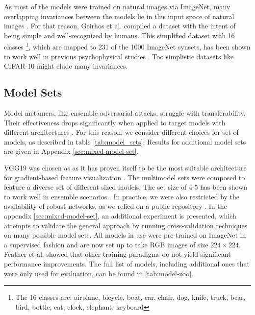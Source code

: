 \documentclass[pdflatex,sn-mathphys-num]{sn-jnl}%
\theoremstyle{thmstyleone}%
\theoremstyle{thmstyletwo}%
\theoremstyle{thmstylethree}%
\begin{document}
As most of the models were trained on natural images via ImageNet,
many overlapping invariances between the models lie in this input space of natural images \cite{deng_imagenet_2009}.
For that reason, Geirhos et al. \cite{geirhos_generalisation_2020} compiled a dataset with the intent of being simple and well-recognized by humans.
This simplified dataset with 16 classes \footnote{The 16 classes are: airplane, bicycle, boat, car, chair, dog, knife, truck, bear, bird, bottle, cat, clock, elephant, keyboard}, which are mapped to 231 of the 1000 ImageNet synsets, has been shown to work well in previous psychophysical studies \cite{feather_model_2023}.
Too simplistic datasets like CIFAR-10 might elude many invariances.

\subsection{Model Sets}

Model metamers, like ensemble adversarial attacks, struggle with transferability. Their effectiveness drops significantly when applied to target models with different architectures \cite{chen_adaptive_2023}.
For this reason, we consider different choices for set of models, as described in table \ref{tab:model_sets}. Results for additional model sets are given in Appendix \ref{sec:mixed-model-set}.



VGG19 was chosen as  as it has proven itself to be the most suitable architecture for gradient-based feature visualization \cite{mordvintsev_differentiable_2018}.
The multimodel sets were composed to feature a diverse set of different sized models.
The set size of 4-5 has been shown to work well in ensemble scenarios \cite{shen_meal_2019}.
In practice, we were also restricted by the availability of robust networks, as we relied on a public repository \cite{croce_robustbench_2021}.
In the appendix \ref{sec:mixed-model-set}, an additional experiment is presented, which attempts to validate the general approach by running cross-validation techniques on many possible model sets. 
All models in use were pre-trained on ImageNet in a supervised fashion and are now set up to take RGB images of size $224 \times 224$.
Feather et al. \cite{feather_model_2023} showed that other training paradigms do not yield significant performance improvements.
The full list of models, including additional ones that were only used for evaluation, can be found in \cref{tab:model-zoo}.
\end{document}
